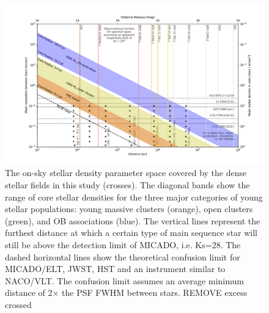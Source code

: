 \begin{figure}

    \centering
    \includegraphics[width=\textwidth]{images/resolved_stellar_densities.pdf}

    \caption{The on-sky stellar density parameter space covered by the dense stellar fields in this study (crosses). 
    The diagonal bands show the range of core stellar densities for the three major categories of young stellar populations: young massive clusters (orange), open clusters (green), and OB associations (blue). 
    The vertical lines represent the furthest distance at which a certain type of main sequence star will still be above the detection limit of MICADO, i.e. Ks=28\m.
    The dashed horizontal lines show the theoretical confusion limit for MICADO/ELT, JWST, HST and an instrument similar to NACO/VLT. The confusion limit assumes an average minimum distance of 2$\times$ the PSF FWHM between stars.
    \rewrite REMOVE excess crossed
    }
    
    \label{fig:resolved_stellar_densities}
    
\end{figure}


